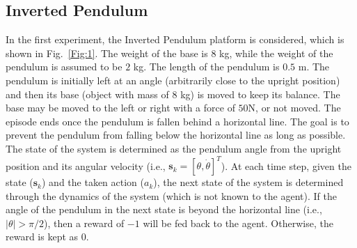 \documentclass{ieeeaccess}
\def\k{_{k}}
\def\s{\bm{s}}
\begin{document}
\subsection{Inverted Pendulum}  \label{sec:cart_pole}
In the first experiment, the Inverted Pendulum platform is considered, which is shown in Fig.~\ref{Fig:1}. The weight of the base is $8$ kg, while the weight of the pendulum is assumed to be $2$ kg. The length of the pendulum is $0.5$ m. The pendulum is initially left at an angle (arbitrarily close to the upright position) and then its base (object with mass of $8$ kg) is moved to keep its balance. The base may be moved to the left or right with a force of
$50$N, or not moved. The episode ends once the pendulum is fallen behind a horizontal line. The goal is to prevent the pendulum from falling below the horizontal line as long as possible. The state of the system is determined as the pendulum angle from the upright position and its angular velocity (i.e., $\s\k = [\theta, \dot{\theta}]^T$). At each time step, given the state ($\s\k$) and the taken action ($a\k$), the next state of the system is determined through the dynamics of the system (which is not known to the agent). If the angle of the pendulum in the next state is beyond the horizontal line (i.e., $|\theta| >\pi/2$), then a reward of $-1$ will be fed back to the agent. Otherwise, the reward is kept as $0$.
\end{document}
